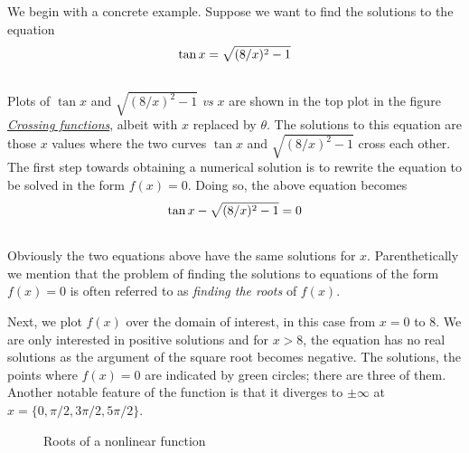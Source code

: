\documentclass[letterpaper,10pt,english]{sphinxmanual}
\begin{document}
We begin with a concrete example.  Suppose we want to find the solutions to the equation
\begin{gather}
\begin{split}\tan x=\sqrt{(8/x)^2-1}\end{split}\notag\\\begin{split}\end{split}\notag
\end{gather}
Plots of $\tan x$ and $\sqrt{(8/x)^2-1}$ \emph{vs} $x$ are shown in the top plot in the figure {\hyperref[chap5/chap5_plot:fig-subplotdemo]{\emph{Crossing functions}}}, albeit with $x$ replaced by $\theta$.  The solutions to this equation are those $x$ values where the two curves $\tan x$ and $\sqrt{(8/x)^2-1}$ cross each other. The first step towards obtaining a numerical solution is to rewrite the equation to be solved in the form $f(x)=0$.  Doing so, the above equation becomes
\begin{gather}
\begin{split}\tan x - \sqrt{(8/x)^2-1} = 0\end{split}\notag\\\begin{split}\end{split}\notag
\end{gather}
Obviously the two equations above have the same solutions for $x$.  Parenthetically we mention that the problem of finding the solutions to equations of the form $f(x)=0$ is often referred to as \emph{finding the roots} of $f(x)$.

Next, we plot $f(x)$ over the domain of interest, in this case from $x=0$ to 8.  We are only interested in positive solutions and for $x>8$, the equation has no real solutions as the argument of the square root becomes negative.  The solutions, the points where $f(x)=0$ are indicated by green circles; there are three of them. Another notable feature of the function is that it diverges to $\pm\infty$ at $x = \{0, \pi/2, 3\pi/2, 5\pi/2\}$.
\begin{figure}[htbp]
\centering
\capstart

\caption{Roots of a nonlinear function}\label{chap9/chap9_scipy:fig-rootdemo}\end{figure}
\end{document}
